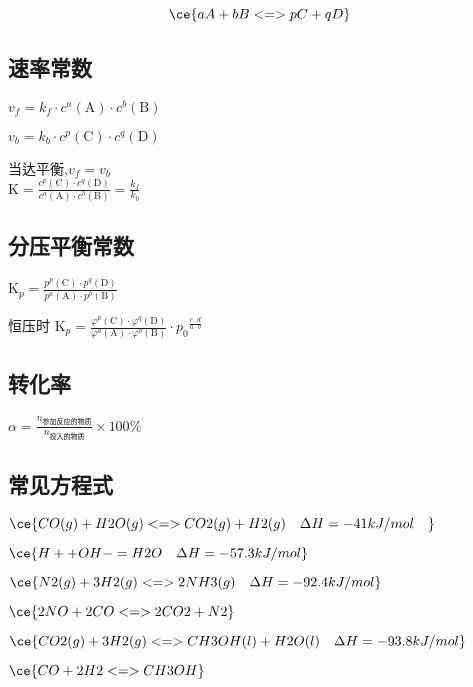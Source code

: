 \documentclass[UTF8]{article}
\begin{document}
$$
\ce{a A +b B <=> pC +qD}
$$
\subsection{速率常数}

$
v_f = k_f \cdot {c^a}({\text{A}}) \cdot {c^b}({\text{B}})$

$v_b = k_b \cdot {c^p}({\text{C}}) \cdot {c^q}({\text{D}})
$


当达平衡,$v_f=v_b$\\
$
{\text{K}} = \frac{{{c^p}({\text{C}}) \cdot {c^q}({\text{D}})}}{{{c^a}({\text{A}}) \cdot {c^b}({\text{B}})}} = \frac{k_f}{k_b}
$

 
\subsection{分压平衡常数}

$
{{\text{K}}_p} = \frac{{{p^p}({\text{C}}) \cdot {p^q}({\text{D}})}}{{{p^a}({\text{A}}) \cdot {p^b}({\text{B}})}}
$


恒压时
$
{{\text{K}}_p} = \frac{{{\varphi ^p}({\text{C}}) \cdot {\varphi ^q}({\text{D}})}}{{{\varphi ^a}({\text{A}}) \cdot {\varphi ^b}({\text{B}})}} \cdot {p_0}^{\frac{{c \cdot d}}{{a \cdot b}}}
$

 
\subsection{转化率}

$
\alpha  = \frac{n_{\text{参加反应的物质}}}{n_{\text{投入的物质}}}\times100\%
$






\subsection{常见方程式}
\begin{center}
$
\ce{CO(g) +H2O(g) <=>CO2(g) +H2(g)\quad\Delta H=- 41 kJ/mol\quad}
$

$
\ce{H+ +OH- =  H2O \quad\Delta H=- 57.3 kJ/mol}
$

$
\ce{N2(g) +3H2(g) <=> 2 NH3(g) \quad\Delta H=- 92.4 kJ/mol}
$

$
\ce{2 NO +2CO <=>2CO2 +N2}
$

$
\ce{CO2(g) +3H2(g)<=>CH3OH(l) +H2O(l)\quad\Delta  H=- 93.8 kJ/mol} 
$

$
\ce{CO +2H2<=>CH3OH }
$
\end{center}





\end{document}

